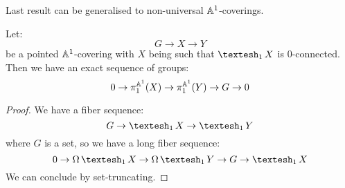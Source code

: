 Last result can be generalised to non-universal $\mathbb{A}^1$-coverings.

\begin{corollary}\label{connected-cover-pi1}
Let:
\[G\to X\to Y\]
be a pointed $\mathbb{A}^1$-covering with $X$ being such that $\shape_1X$ is $0$-connected. Then we have an exact sequence of groups:
\[0 \to \pi_1^{\mathbb{A}^1}(X) \to \pi_1^{\mathbb{A}^1}(Y)\to G\to 0\]
\end{corollary}

\begin{proof}
We have a fiber sequence:
\[G\to \shape_1 X\to \shape_1Y\]
where $G$ is a set, so we have a long fiber sequence:
\[0 \to\Omega\shape_1X\to \Omega\shape_1Y\to G\to \shape_1X\]
We can conclude by set-truncating.
\end{proof}
